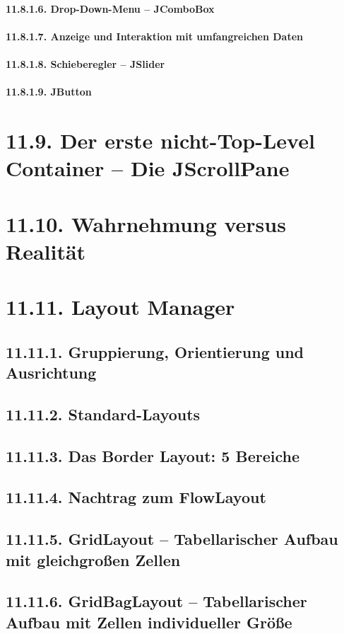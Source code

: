 \paragraph{11.8.1.6.	Drop-Down-Menu – JComboBox}
\paragraph{11.8.1.7.	Anzeige und Interaktion mit umfangreichen Daten}
\paragraph{11.8.1.8.	Schieberegler – JSlider}
\paragraph{11.8.1.9.	JButton}
\section{11.9.	Der erste nicht-Top-Level Container – Die JScrollPane}
\section{11.10.	Wahrnehmung versus Realität}
\section{11.11.	Layout Manager}
\subsection{11.11.1.	Gruppierung, Orientierung und Ausrichtung}
\subsection{11.11.2.	Standard-Layouts}
\subsection{11.11.3.	Das Border Layout: 5 Bereiche}
\subsection{11.11.4.	Nachtrag zum FlowLayout}
\subsection{11.11.5.	GridLayout – Tabellarischer Aufbau mit gleichgroßen Zellen}
\subsection{11.11.6.	GridBagLayout – Tabellarischer Aufbau mit Zellen individueller Größe}
